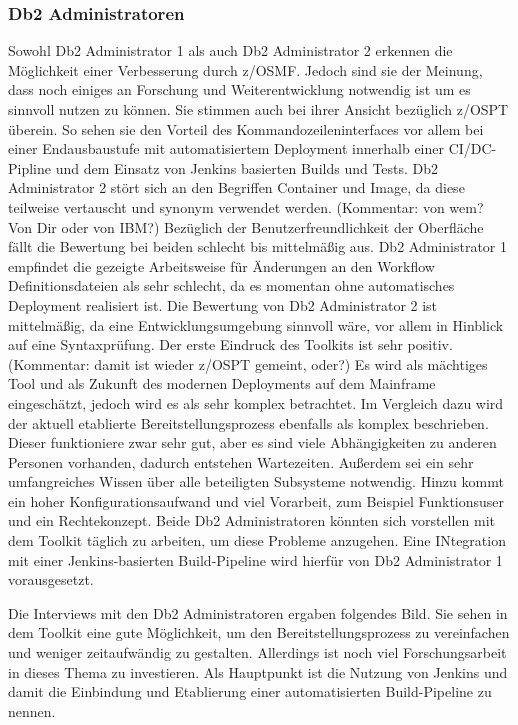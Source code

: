 \subsubsection{Db2 Administratoren}
Sowohl Db2 Administrator 1 als auch Db2 Administrator 2 erkennen die Möglichkeit einer Verbesserung durch z/OSMF.
Jedoch sind sie der Meinung, dass noch einiges an Forschung und Weiterentwicklung notwendig ist um es sinnvoll nutzen zu können.
Sie stimmen auch bei ihrer Ansicht bezüglich z/OSPT überein.
So sehen sie den Vorteil des Kommandozeileninterfaces vor allem bei einer Endausbaustufe mit automatisiertem Deployment innerhalb einer CI/DC-Pipline und dem Einsatz von Jenkins basierten Builds und Tests.
Db2 Administrator 2 stört sich an den Begriffen \glqq Container\grqq{} und \glqq Image\grqq, da diese teilweise vertauscht und synonym verwendet werden. (Kommentar: von wem? Von Dir oder von IBM?)
Bezüglich der Benutzerfreundlichkeit der Oberfläche fällt die Bewertung bei beiden schlecht bis mittelmäßig aus.
Db2 Administrator 1 empfindet die gezeigte Arbeitsweise für Änderungen an den Workflow Definitionsdateien als sehr schlecht, da es momentan ohne automatisches Deployment realisiert ist.
Die Bewertung von Db2 Administrator 2 ist mittelmäßig, da eine Entwicklungsumgebung sinnvoll wäre, vor allem in Hinblick auf eine Syntaxprüfung.
Der erste Eindruck des Toolkits ist sehr positiv. (Kommentar: damit ist wieder z/OSPT gemeint, oder?)
Es wird als mächtiges Tool und als Zukunft des modernen Deployments auf dem Mainframe eingeschätzt, jedoch wird es als sehr komplex betrachtet.
Im Vergleich dazu wird der aktuell etablierte Bereitstellungsprozess ebenfalls als komplex beschrieben.
Dieser funktioniere zwar sehr gut, aber es sind viele Abhängigkeiten zu anderen Personen vorhanden, dadurch entstehen Wartezeiten.
Außerdem sei ein sehr umfangreiches Wissen über alle beteiligten Subsysteme notwendig.
Hinzu kommt ein hoher Konfigurationsaufwand und viel Vorarbeit, zum Beispiel Funktionsuser und ein Rechtekonzept.
Beide Db2 Administratoren könnten sich  vorstellen mit dem Toolkit täglich zu arbeiten, um diese Probleme anzugehen.
Eine INtegration mit einer Jenkins-basierten Build-Pipeline wird hierfür von Db2 Administrator 1 vorausgesetzt.

Die Interviews mit den Db2 Administratoren ergaben folgendes Bild.
Sie sehen in dem Toolkit eine gute Möglichkeit, um den Bereitstellungsprozess zu vereinfachen und weniger zeitaufwändig zu gestalten.
Allerdings ist noch viel Forschungsarbeit in dieses Thema zu investieren.
Als Hauptpunkt ist die Nutzung von Jenkins und damit die Einbindung und Etablierung einer automatisierten Build-Pipeline zu nennen.


